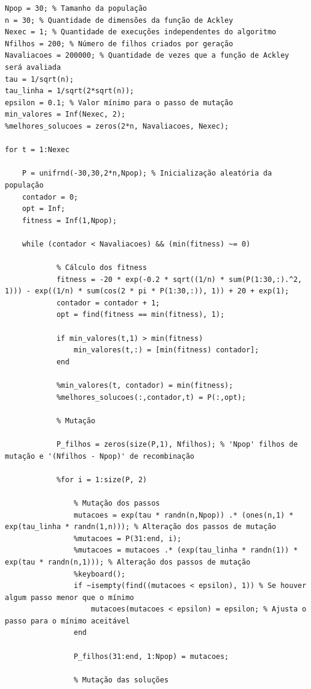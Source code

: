 \documentclass{report}
\begin{document}
	\begin{lstlisting}
Npop = 30; % Tamanho da população
n = 30; % Quantidade de dimensões da função de Ackley
Nexec = 1; % Quantidade de execuções independentes do algoritmo
Nfilhos = 200; % Número de filhos criados por geração
Navaliacoes = 200000; % Quantidade de vezes que a função de Ackley será avaliada
tau = 1/sqrt(n);
tau_linha = 1/sqrt(2*sqrt(n));
epsilon = 0.1; % Valor mínimo para o passo de mutação
min_valores = Inf(Nexec, 2);
%melhores_solucoes = zeros(2*n, Navaliacoes, Nexec);

for t = 1:Nexec

    P = unifrnd(-30,30,2*n,Npop); % Inicialização aleatória da população
    contador = 0;
    opt = Inf;
    fitness = Inf(1,Npop);

    while (contador < Navaliacoes) && (min(fitness) ~= 0)
            
            % Cálculo dos fitness
            fitness = -20 * exp(-0.2 * sqrt((1/n) * sum(P(1:30,:).^2, 1))) - exp((1/n) * sum(cos(2 * pi * P(1:30,:)), 1)) + 20 + exp(1);
            contador = contador + 1;
            opt = find(fitness == min(fitness), 1); 

            if min_valores(t,1) > min(fitness)
                min_valores(t,:) = [min(fitness) contador];
            end

            %min_valores(t, contador) = min(fitness);
            %melhores_solucoes(:,contador,t) = P(:,opt);

            % Mutação

            P_filhos = zeros(size(P,1), Nfilhos); % 'Npop' filhos de mutação e '(Nfilhos - Npop)' de recombinação

            %for i = 1:size(P, 2)
            
                % Mutação dos passos
                mutacoes = exp(tau * randn(n,Npop)) .* (ones(n,1) * exp(tau_linha * randn(1,n))); % Alteração dos passos de mutação
                %mutacoes = P(31:end, i);
                %mutacoes = mutacoes .* (exp(tau_linha * randn(1)) * exp(tau * randn(n,1))); % Alteração dos passos de mutação
                %keyboard();
                if ~isempty(find((mutacoes < epsilon), 1)) % Se houver algum passo menor que o mínimo
                    mutacoes(mutacoes < epsilon) = epsilon; % Ajusta o passo para o mínimo aceitável
                end
                
                P_filhos(31:end, 1:Npop) = mutacoes;

                % Mutação das soluções
                

\end{lstlisting}
\end{document}
